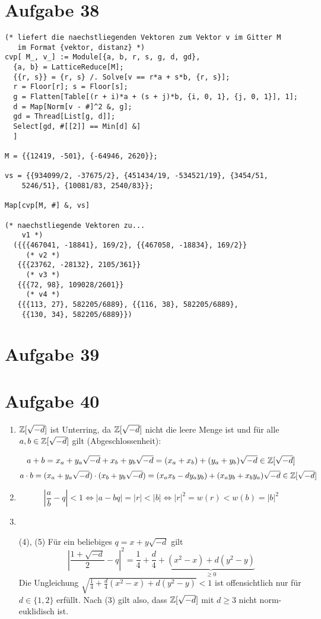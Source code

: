 \section*{Aufgabe 38}
\begin{lstlisting}
(* liefert die naechstliegenden Vektoren zum Vektor v im Gitter M 
   im Format {vektor, distanz} *)
cvp[ M_, v_] := Module[{a, b, r, s, g, d, gd},
  {a, b} = LatticeReduce[M];
  {{r, s}} = {r, s} /. Solve[v == r*a + s*b, {r, s}];
  r = Floor[r]; s = Floor[s];
  g = Flatten[Table[(r + i)*a + (s + j)*b, {i, 0, 1}, {j, 0, 1}], 1];
  d = Map[Norm[v - #]^2 &, g];
  gd = Thread[List[g, d]];
  Select[gd, #[[2]] == Min[d] &]
  ]

M = {{12419, -501}, {-64946, 2620}};

vs = {{934099/2, -37675/2}, {451434/19, -534521/19}, {3454/51, 
    5246/51}, {10081/83, 2540/83}};

Map[cvp[M, #] &, vs]

(* naechstliegende Vektoren zu...
	v1 *)
  ({{{467041, -18841}, 169/2}, {{467058, -18834}, 169/2}}
     (* v2 *)
   {{{23762, -28132}, 2105/361}}
     (* v3 *)
   {{{72, 98}, 109028/2601}}
     (* v4 *)
   {{{113, 27}, 582205/6889}, {{116, 38}, 582205/6889},
   	{{130, 34}, 582205/6889}})
\end{lstlisting}

\section*{Aufgabe 39}

\section*{Aufgabe 40}
\newcommand{\Zd}{\Z[\sqrt{-d}]}
\begin{enumerate}[(1)]
\item
	$\Zd$ ist Unterring, da $\Zd$ nicht die leere Menge ist und für alle
	$a, b \in \Zd$ gilt (Abgeschlossenheit):

	\[ a + b = x_a + y_a \sqrt{-d} + x_b + y_b \sqrt{-d} = (x_a + x_b) +
	(y_a + y_b) \sqrt{-d} \in \Zd \]
	\[ a \cdot b = (x_a + y_a \sqrt{-d}) \cdot (x_b + y_b \sqrt{-d}) = (x_a
	x_b - d y_a y_b) + (x_a y_b + x_b y_a) \sqrt{-d} \in \Zd \]

\item
	\[ \left| \frac{a}{b} - q \right| < 1 \Leftrightarrow \left|a -
	bq\right| = |r| < |b| \Leftrightarrow |r|^2 = w(r) < w(b) = |b|^2 \]

\item
	
\item[(4), (5)]
	Für ein beliebiges $q = x + y \sqrt{-d}$ gilt
	\[ \left|\frac{1+\sqrt{-d}}{2} - q \right|^2 = \frac{1}{4}+\frac{d}{4}
	+ \underbrace{(x^2 - x) + d(y^2 - y)}_{\geq 0} \]
	Die Ungleichung $\sqrt{\frac{1}{4}+\frac{d}{4} (x^2 - x) + d(y^2 - y)}
	< 1$ ist offensichtlich nur für $d \in \{1,2\}$ erfüllt. Nach (3) gilt
	also, dass $\Zd$ mit $d \geq 3$ nicht norm-euklidisch ist.
\end{enumerate}
